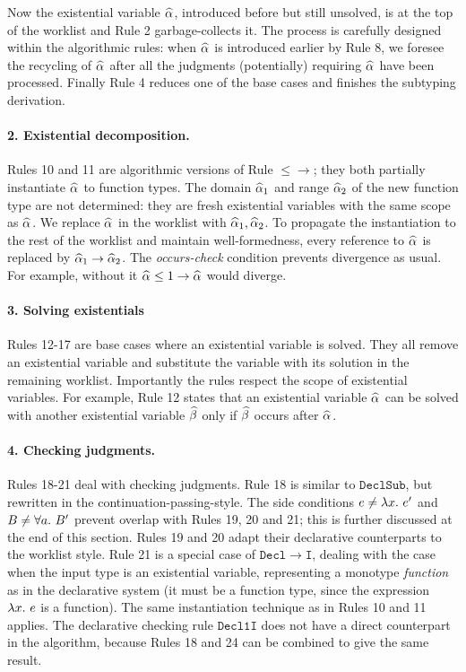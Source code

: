 Now the existential variable $\al$, introduced before but still unsolved,
is at the top of the worklist and Rule 2 garbage-collects it.
The process is carefully designed within the algorithmic rules:
when $\al$ is introduced earlier by Rule 8,
we foresee the recycling of $\al$ after all the judgments (potentially)
requiring $\al$ have been processed.
Finally Rule 4 reduces one of the base cases and finishes the subtyping derivation.

\paragraph{\bf 2. Existential decomposition.}
Rules 10 and 11 are algorithmic versions of Rule $\mathtt{{\le}{\to}}$; they
both partially instantiate $\al$ to function types.
The domain $\al[1]$ and range $\al[2]$ of the new function type are not determined:
they are fresh existential variables with the same scope as $\al$.
We replace $\al$ in the worklist with  $\al[1], \al[2]$.
To propagate the instantiation to the rest of the worklist and maintain well-formedness,
every reference to $\al$ is replaced by $\al[1] \to \al[2]$.
The \emph{occurs-check} condition prevents divergence as usual.
For example, without it $\al \le 1 \to \al$ would diverge.

\paragraph{\bf 3. Solving existentials} Rules 12-17 are base cases where an existential variable is solved.
They all remove an existential variable and substitute the
variable with its solution in the remaining worklist. Importantly the rules
respect the scope of existential variables. For example, Rule 12 
states that an existential variable $\al$ can be solved with another
existential variable $\bt$ only if $\bt$ occurs after $\al$.

\paragraph{\bf 4. Checking judgments.}
Rules 18-21 deal with checking judgments.
Rule 18 is similar to $\mathtt{DeclSub}$, but rewritten in the
continuation-passing-style.
The side conditions $e \neq \lam e'$ and $B \neq \all B'$ 
prevent overlap with Rules 19, 20 and 21;
this is further discussed at the end of this section.
Rules 19 and 20 adapt their declarative counterparts to the worklist style.
Rule 21 is a special case of $\mathtt{Decl\to I}$,
dealing with the case when the input type is an existential variable,
representing a monotype \emph{function} as in the declarative system
(it must be a function type, since the expression $\lam e$ is a function).
The same instantiation technique as in Rules 10 and 11 applies.
The declarative checking rule $\mathtt{Decl1I}$ does not have a direct counterpart in the algorithm, 
because Rules 18 and 24 can be combined to give the same result.

